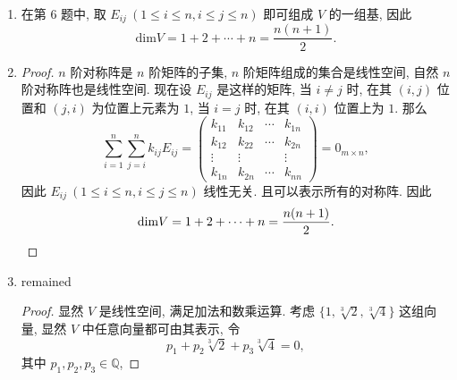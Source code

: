 \begin{enumerate}
\begin{proof}
\[\begin{array}{cccc}
                        k_{21} & k_{22} & \cdots & k_{2n} \\
                        \vdots & \vdots &  & \vdots \\
                        k_{m1} & k_{m2} & \cdots & k_{mn}
                    \end{array}    
                \right)
                = 0_{m\times n},  
            \]
            只能 $k_{ij} = 0\ (1 \leq i \leq m, 1 \leq j \leq n)$, 故 $E_{ij}\ (1 \leq i \leq m, 1 \leq j \leq n)$ 线性无关.
            另一方面, 数域 $\mathbb{K}$ 上全体 $m \times n$ 矩阵显然可由 $E_{ij}\ (1 \leq i \leq m, 1 \leq j \leq n)$ 线性表示.
            因此 $E_{ij}\ (1 \leq i \leq m, 1 \leq j \leq n)$ 是一组基.
        \end{proof}
    \item %
        在第 6 题中, 取 $E_{ij}\ (1 \leq i \leq n, i \leq j \leq n)$ 即可组成 $V$ 的一组基, 因此
        \[
            \mathrm{dim}V = 1 + 2 + \cdots + n = \frac{n(n+1)}{2}.    
        \]
    \item %
        \begin{proof}
            $n$ 阶对称阵是 $n$ 阶矩阵的子集, $n$ 阶矩阵组成的集合是线性空间, 自然 $n$ 阶对称阵也是线性空间.
            现在设 $E_{ij}$ 是这样的矩阵, 当 $i \not= j$ 时, 在其 $(i, j)$ 位置和 $(j, i)$ 为位置上元素为 $1$, 当 $i = j$ 时, 在其 $(i, i)$ 位置上为 $1$.
            那么
            \[
                \sum_{i=1}^n\sum_{j=i}^nk_{ij}E_{ij} =
                \left(
                    \begin{array}{cccc}
                        k_{11} & k_{12} & \cdots & k_{1n} \\
                        k_{12} & k_{22} & \cdots & k_{2n} \\
                        \vdots & \vdots &  & \vdots \\
                        k_{1n} & k_{2n} & \cdots & k_{nn}
                    \end{array}    
                \right)
                = 0_{m\times n},  
            \]
            因此 $E_{ij}\ (1 \leq i \leq n, i \leq j \leq n)$ 线性无关. 且可以表示所有的对称阵. 因此
            \[
                \mathrm{dim}V = 1 + 2 + \cdots + n = \frac{n(n+1)}{2}. \qedhere
            \]
        \end{proof}
    \item %
        {\color{red}remained}
        \begin{proof}
            显然 $V$ 是线性空间, 满足加法和数乘运算. 考虑 $\{1, \sqrt[3]{2}, \sqrt[3]{4}\}$ 这组向量, 显然 $V$ 中任意向量都可由其表示, 令
            \[
                p_1 + p_2\sqrt[3]{2} + p_3\sqrt[3]{4} = 0,   
            \]
            其中 $p_1, p_2, p_3 \in \mathbb{Q}$,
        \end{proof}
\end{enumerate}
% 
